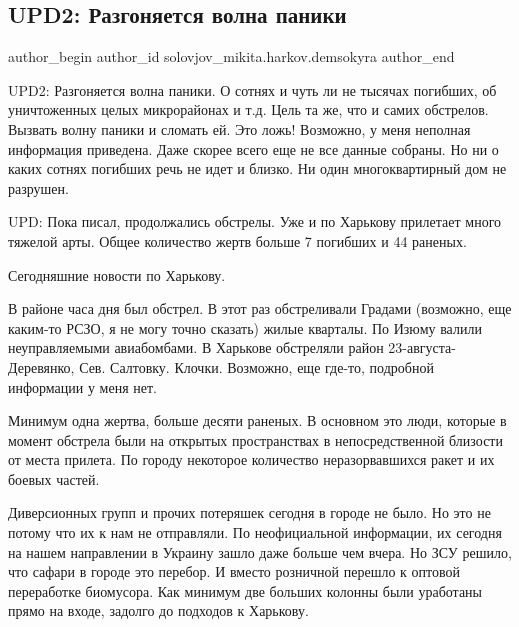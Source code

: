  
 
 
 
 

\subsection{UPD2: Разгоняется волна паники}
\label{sec:28_02_2022.fb.solovjov_mikita.harkov.demsokyra.1.upd2__razgonyaetsya_}

\ifcmt
 author_begin
   author_id solovjov_mikita.harkov.demsokyra
 author_end
\fi

UPD2: Разгоняется волна паники. О сотнях и чуть ли не тысячах погибших, об
уничтоженных целых микрорайонах и т.д. Цель та же, что и самих обстрелов.
Вызвать волну паники и сломать ей. Это ложь! Возможно, у меня неполная
информация приведена. Даже скорее всего еще не все данные собраны. Но ни о
каких сотнях погибших речь не идет и близко. Ни один многоквартирный дом не
разрушен. 

UPD: Пока писал, продолжались обстрелы. Уже и по Харькову прилетает много
тяжелой арты. Общее количество жертв больше 7 погибших и 44 раненых.

Сегодняшние новости по Харькову. 

В районе часа дня был обстрел. В этот раз обстреливали Градами (возможно, еще
каким-то РСЗО, я не могу точно сказать) жилые кварталы. По Изюму валили
неуправляемыми авиабомбами. В Харькове обстреляли район 23-августа-Деревянко,
Сев. Салтовку. Клочки. Возможно, еще где-то, подробной информации у меня нет. 

Минимум одна жертва, больше десяти раненых. В основном это люди, которые в
момент обстрела были на открытых пространствах в непосредственной близости от
места прилета. По городу некоторое количество неразорвавшихся ракет и их боевых
частей. 

Диверсионных групп и прочих потеряшек сегодня в городе не было. Но это не
потому что их к нам не отправляли. По неофициальной информации, их сегодня на
нашем направлении в Украину зашло даже больше чем вчера. Но ЗСУ решило, что
сафари в городе это перебор. И вместо розничной перешло к оптовой переработке
биомусора. Как минимум две больших колонны были уработаны прямо на входе,
задолго до подходов к Харькову. 

